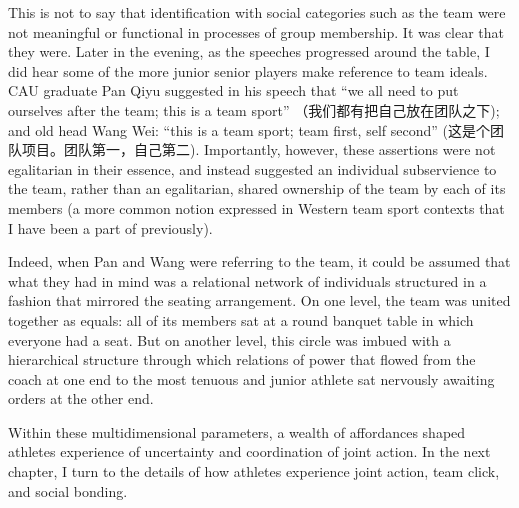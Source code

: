 \begin{CJK}{UTF8}{gbsn}
This is not to say that identification with social categories such as the team were not meaningful or functional in processes of group membership. It was clear that they were.  Later in the evening, as the speeches progressed around the table, I did hear some of the more junior senior players make reference to team ideals.  CAU graduate Pan Qiyu suggested in his speech that ``we all need to put ourselves after the team; this is a team sport'' （我们都有把自己放在团队之下); and old head Wang Wei: ``this is a team sport; team first, self second'' (这是个团队项目。团队第一，自己第二).  Importantly, however, these assertions were not egalitarian in their essence, and instead suggested an individual subservience to the team, rather than an egalitarian, shared ownership of the team by each of its members (a more common notion expressed in Western team sport contexts that I have been a part of previously).

Indeed, when Pan and Wang were referring to the team, it could be assumed that what they had in mind was a relational network of individuals structured in a fashion that mirrored the seating arrangement. On one level, the team was united together as equals: all of its members sat at a round banquet table in which everyone had a seat. But on another level, this circle was imbued with a hierarchical structure through which relations of power that flowed from the coach at one end to the most tenuous and junior athlete sat nervously awaiting orders at the other end.

Within these multidimensional parameters, a wealth of affordances shaped athletes experience of uncertainty and coordination of joint action.  In the next chapter, I turn to the details of how athletes experience joint action, team click, and social bonding.














            \end{CJK}
